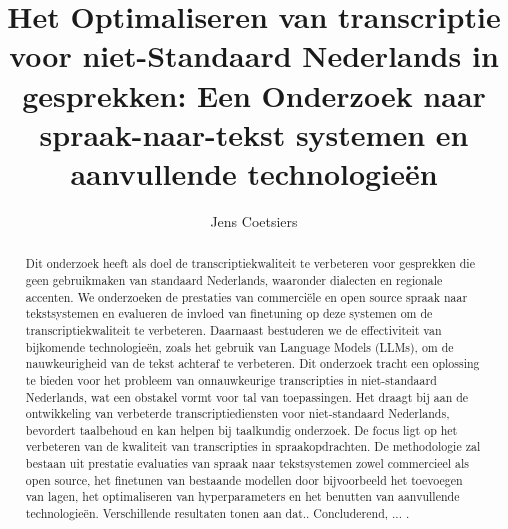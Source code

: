 \documentclass{hogent-article}
\title{Het Optimaliseren van transcriptie voor niet-Standaard Nederlands in gesprekken: Een Onderzoek naar spraak-naar-tekst systemen en aanvullende technologieën}
\author{Jens Coetsiers}
\begin{document}
\begin{abstract}
Dit onderzoek heeft als doel de transcriptiekwaliteit te verbeteren voor gesprekken die geen gebruikmaken van standaard Nederlands, waaronder dialecten en regionale accenten. We onderzoeken de prestaties van commerciële en open source spraak naar tekstsystemen en evalueren de invloed van finetuning op deze systemen om de transcriptiekwaliteit te verbeteren. Daarnaast bestuderen we de effectiviteit van bijkomende technologieën, zoals het gebruik van Language Models (LLMs), om de nauwkeurigheid van de tekst achteraf te verbeteren. Dit onderzoek tracht een oplossing te bieden voor het probleem van onnauwkeurige transcripties in niet-standaard Nederlands, wat een obstakel vormt voor tal van toepassingen. Het draagt bij aan de ontwikkeling van verbeterde transcriptiediensten voor niet-standaard Nederlands, bevordert taalbehoud en kan helpen bij taalkundig onderzoek. De focus ligt op het verbeteren van de kwaliteit van transcripties in spraakopdrachten.
De methodologie zal bestaan uit prestatie evaluaties van spraak naar tekstsystemen zowel commercieel als open source, het finetunen van bestaande modellen door bijvoorbeeld het toevoegen van lagen, het optimaliseren van hyperparameters en het benutten van aanvullende technologieën.
Verschillende resultaten tonen aan dat..
Concluderend, ... . 
\end{abstract}

\tableofcontents



\printbibliography[heading=bibintoc]
\end{document}
